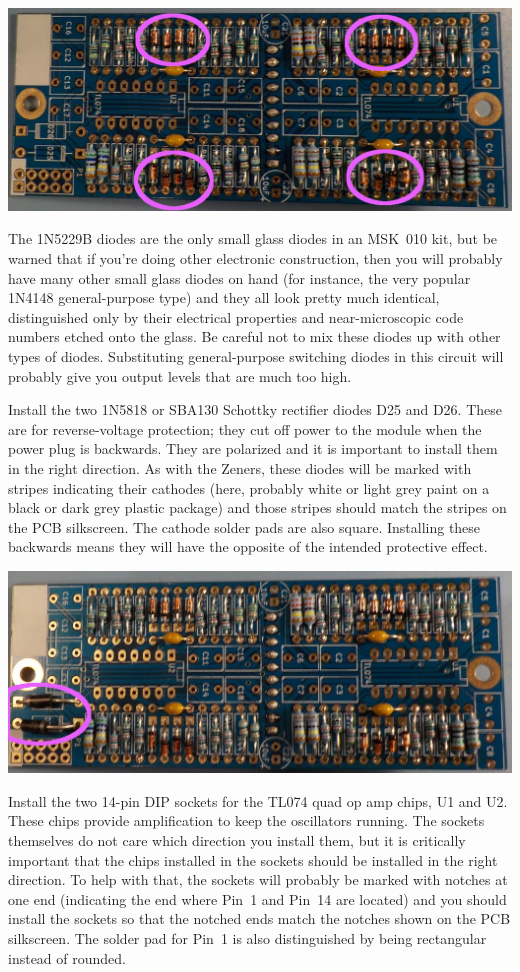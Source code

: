 \noindent\includegraphics[width=\linewidth]{zenerA.jpg}

The 1N5229B diodes are the only small glass diodes in an MSK~010 kit, but be
warned that if you're doing other electronic construction, then you will
probably have many other small glass diodes on hand (for instance, the very
popular 1N4148 general-purpose type) and they all look pretty much
identical, distinguished only by their electrical properties and
near-microscopic code numbers etched onto the glass.  Be careful not to mix
these diodes up with other types of diodes.  Substituting general-purpose
switching diodes in this circuit will probably give you output levels that
are much too high.

Install the two 1N5818 or SBA130 Schottky rectifier diodes D25 and D26. 
These are for reverse-voltage protection; they cut off power to the module
when the power plug is backwards.  They are polarized and it is important to
install them in the right direction.  As with the Zeners, these diodes will
be marked with stripes indicating their cathodes (here, probably white or
light grey paint on a black or dark grey plastic package) and those stripes
should match the stripes on the PCB silkscreen.  The cathode solder pads are
also square.  Installing these backwards means they will have the opposite
of the intended protective effect.

\noindent\includegraphics[width=\linewidth]{schottkyA.jpg}

Install the two 14-pin DIP sockets for the TL074 quad op amp chips, U1 and
U2.  These chips provide amplification to keep the oscillators running.  The
sockets themselves do not care which direction you install them, but it is
critically important that the chips installed in the sockets should be
installed in the right direction.  To help with that, the sockets will
probably be marked with notches at one end (indicating the end where Pin~1
and Pin~14 are located) and you should install the sockets so that the
notched ends match the notches shown on the PCB silkscreen.  The solder pad
for Pin~1 is also distinguished by being rectangular instead of rounded.

